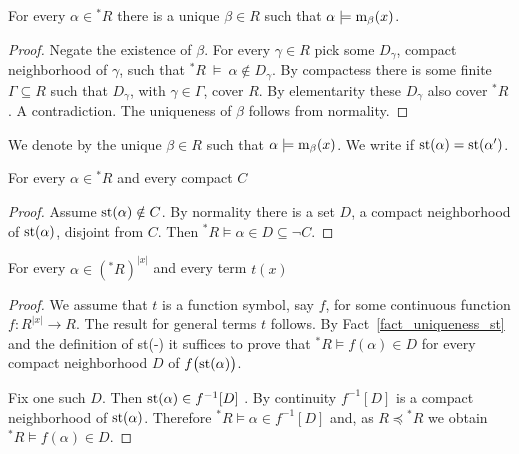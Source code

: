 \documentclass[11pt,oneside]{amsart}
\renewcommand*{\emph}[1]{%
   \smash{\tikz[baseline]\node[rectangle, fill=teal!25, rounded corners, inner xsep=0.5ex, inner ysep=0.2ex, anchor=base, minimum height = 2.7ex]{#1};}}
\begin{document}
\begin{fact}\label{fact_uniqueness_st}
  For every $\alpha\in{}^*\!R$ there is a unique $\beta\in R$ such that $\alpha\models{\rm m}_\beta(x)$.
\end{fact}

\begin{proof}
  Negate the existence of $\beta$.
  For every $\gamma\in R$ pick some $D_\gamma$, compact neighborhood of $\gamma$, such that ${}^*\!R\ \models\ \alpha\notin D_\gamma$.
  By compactess there is some finite $\Gamma\subseteq R$ such that $D_\gamma$, with $\gamma\in\Gamma$, cover $R$.
  By elementarity these $D_{\gamma}$ also cover ${}^*\!R$.
  A contradiction.
  The uniqueness of $\beta$ follows from normality.
\end{proof}

We denote by \emph{${\rm st}(\alpha)$\/} the unique $\beta\in R$ such that $\alpha\models{\rm m}_\beta(x)$.
We write \emph{$\alpha\approx\alpha'$\/} if ${\rm st}(\alpha)={\rm st}(\alpha')$.

\begin{fact}\label{fact_st1}
  For every $\alpha\in{}^*\! R$ and every compact $C$

\end{fact}

\begin{proof}
  Assume ${\rm st}(\alpha)\notin C$.
  By normality there is a set $D$, a compact neighborhood of ${\rm st}(\alpha)$, disjoint from $C$.
  Then  ${}^*\!R\models\alpha\in D\subseteq\neg C$.
\end{proof}

\begin{fact}\label{fact_terms_st}
  For every $\alpha\in({}^*\! R)^{|x|}$ and every term $t(x)$

\end{fact}

\begin{proof}
  We assume that $t$ is a function symbol, say $f$, for some continuous function $f:R^{|x|}\to R$.
  The result for general terms $t$ follows.
  By Fact~\ref{fact_uniqueness_st} and the definition of st(-) it suffices to prove that ${}^*\!R\models f(\alpha)\in D$ for every compact neighborhood $D$ of $f\big({\rm st}(\alpha)\big)$.
  
  Fix one such $D$.
  Then ${\rm st}(\alpha)\in f^{-1}[D]$ .
  By continuity $f^{-1}[D]$ is a compact neighborhood of ${\rm st}(\alpha)$.
  Therefore ${}^*\!R\models \alpha\in f^{-1}[D]$ and, as $R\preceq{}^*\!R$ we obtain ${}^*\!R\models f(\alpha)\in D$.
\end{proof}
\end{document}
